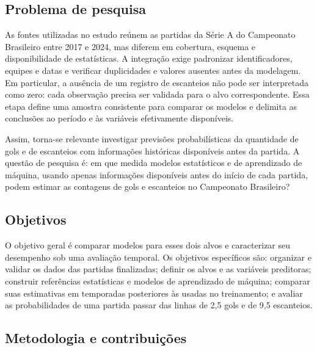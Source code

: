\subsection{Problema de pesquisa}

As fontes utilizadas no estudo reúnem as partidas da Série A do Campeonato Brasileiro entre 2017 e 2024, mas diferem em cobertura, esquema e disponibilidade de estatísticas. A integração exige padronizar identificadores, equipes e datas e verificar duplicidades e valores ausentes antes da modelagem. Em particular, a ausência de um registro de escanteios não pode ser interpretada como zero: cada observação precisa ser validada para o alvo correspondente. Essa etapa define uma amostra consistente para comparar os modelos e delimita as conclusões ao período e às variáveis efetivamente disponíveis.

Assim, torna-se relevante investigar previsões probabilísticas da quantidade de gols e de escanteios com informações históricas disponíveis antes da partida. A questão de pesquisa é: em que medida modelos estatísticos e de aprendizado de máquina, usando apenas informações disponíveis antes do início de cada partida, podem estimar as contagens de gols e escanteios no Campeonato Brasileiro?

\subsection{Objetivos}

O objetivo geral é comparar modelos para esses dois alvos e caracterizar seu desempenho sob uma avaliação temporal. Os objetivos específicos são: organizar e validar os dados das partidas finalizadas; definir os alvos e as variáveis preditoras; construir referências estatísticas e modelos de aprendizado de máquina; comparar suas estimativas em temporadas posteriores às usadas no treinamento; e avaliar as probabilidades de uma partida passar das linhas de 2,5 gols e de 9,5 escanteios.

\subsection{Metodologia e contribuições}

